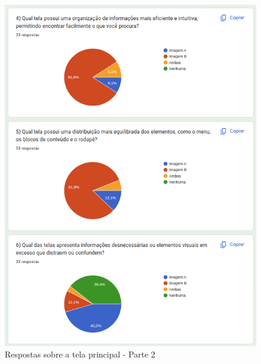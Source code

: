 \begin{figure}[!h]
	\begin{center}
	    \includegraphics[scale=0.7]{figs/Answers/Students/13.png}
	\end{center}
	\caption{\label{APB_TP02}Respostas sobre a tela principal - Parte 2}
\end{figure}

\newpage

